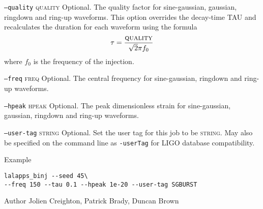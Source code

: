 \begin{entry}
\begin{entry}
\item[\texttt{--quality} \textsc{quality}]
Optional.  The quality factor for sine-gaussian,  gaussian,  ringdown and
ring-up waveforms.    This option overrides the decay-time
\textsc{TAU} and recalculates the duration for each waveform using the
formula
$$ 
\tau = \frac{ \textsc{quality} }{ \sqrt{2} \pi f_0 }
$$
where $f_0$ is the frequency of the injection.

\item[\texttt{--freq} \textsc{freq}]
Optional.  The central frequency for sine-gaussian,  ringdown and
ring-up waveforms.

\item[\texttt{--hpeak} \textsc{hpeak}]
Optional.  The peak dimensionless strain for sine-gaussian,  gaussian,  ringdown and
ring-up waveforms.

\item[\texttt{--user-tag} \textsc{string}] Optional. Set the user tag for this
job to be \textsc{string}. May also be specified on the command line as 
\texttt{-userTag} for LIGO database compatibility.

\end{entry}

\item[Example]
\begin{verbatim}
lalapps_binj --seed 45\
--freq 150 --tau 0.1 --hpeak 1e-20 --user-tag SGBURST
\end{verbatim}

\item[Author] 
Jolien Creighton, Patrick Brady, Duncan Brown
\end{entry}

